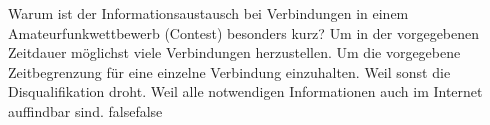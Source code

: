     {Warum ist der Informationsaustausch bei Verbindungen in einem Amateurfunkwettbewerb (Contest) besonders kurz?}
    {Um in der vorgegebenen Zeitdauer möglichst viele Verbindungen herzustellen.}
    {Um die vorgegebene Zeitbegrenzung für eine einzelne Verbindung einzuhalten.}
    {Weil sonst die Disqualifikation droht.}
    {Weil alle notwendigen Informationen auch im Internet auffindbar sind.}
    {false}{false}